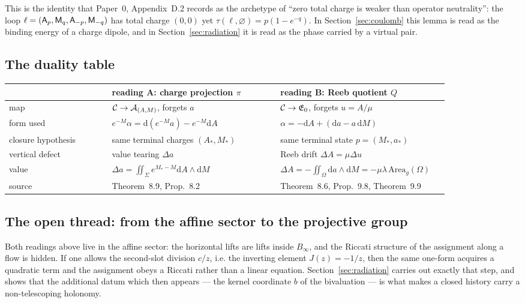 This is the identity that Paper~0, Appendix~D.2 records as the archetype of
``zero total charge is weaker than operator neutrality'': the loop
$\ell=(\mathsf A_p,\mathsf M_q,\mathsf A_{-p},\mathsf M_{-q})$ has total charge $(0,0)$ yet
$\tau(\ell,\varnothing)=p(1-e^{-q})$.  In Section~\ref{sec:coulomb} this lemma is
read as the binding energy of a charge dipole, and in
Section~\ref{sec:radiation} it is read as the phase carried by a virtual pair.

\subsection{The duality table}

\begin{center}\small
\renewcommand{\arraystretch}{1.3}
\begin{tabular}{@{}p{0.22\linewidth}p{0.36\linewidth}p{0.36\linewidth}@{}}
\toprule
 & \textbf{reading A: charge projection $\pi$} & \textbf{reading B: Reeb quotient
 $Q$} \\
\midrule
map & $\mathcal{C}\to\mathcal{A}_{(A,M)}$, forgets $a$
& $\mathcal{C}\to\mathfrak{E}_0$, forgets $u=A/\mu$ \\
form used & $e^{-M}\alpha=\mathrm d(e^{-M}a)-e^{-M}\mathrm dA$
& $\alpha=-\mathrm dA+(\mathrm da-a\,\mathrm dM)$ \\
closure hypothesis & same terminal charges $(A_*,M_*)$
& same terminal state $p=(M_*,a_*)$ \\
vertical defect & value tearing $\Delta a$
& Reeb drift $\Delta A=\mu\Delta u$ \\
value & $\Delta a=\iint_\Sigma e^{M_*-M}\mathrm dA\wedge\mathrm dM$
& $\Delta A=-\iint_\Omega\mathrm da\wedge\mathrm dM
=-\mu\lambda\,\mathrm{Area}_g(\Omega)$ \\
\AEG{} source & Theorem~8.9, Prop.~8.2
& Theorem~8.6, Prop.~9.8, Theorem~9.9 \\
\bottomrule
\end{tabular}
\end{center}

\subsection{The open thread: from the affine sector to the projective group}

Both readings above live in the affine sector: the horizontal lifts are lifts
inside $B_\infty$, and the Riccati structure of the assignment along a flow is
hidden.  If one allows the second-slot division $c/z$, i.e. the inverting
element $J(z)=-1/z$, then the same one-form acquires a quadratic term and the
assignment obeys a Riccati rather than a linear equation.  Section~\ref{sec:radiation}
carries out exactly that step, and shows that the additional datum which then
appears --- the kernel coordinate $b$ of the bivaluation --- is what makes a
closed history carry a non-telescoping holonomy.
